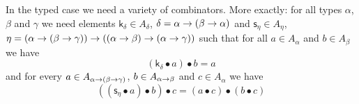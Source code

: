 In the typed case we need a variety of combinators. More exactly:
for all types $\alpha$, $\beta$ and $\gamma$ we need elements
$\mathsf{k}_{\delta} \in A_{\delta}$, $\delta = \alpha \pf %
(\beta \pf \alpha)$ and $\mathsf{s}_{\eta} \in A_{\eta}$, $\eta
= (\alpha \pf (\beta\pf \gamma)) \pf  ((\alpha \pf \beta) \pf (\alpha %
\pf \gamma))$ such that for all $a \in A_{\alpha}$ and %
$b \in A_{\beta}$ we have
\begin{equation}
(\mathsf{k}_{\delta} \bullet a) \bullet b = a
\end{equation}
and for every $a \in A_{\alpha \rightarrow (\beta \rightarrow \gamma)}$,
$b \in A_{\alpha \rightarrow \beta}$ and $c \in A_{\alpha}$ we have
\begin{equation}
((\mathsf{s}_{\eta} \bullet a) \bullet b) \bullet c =
(a \bullet c) \bullet (b \bullet c) 
\end{equation}

